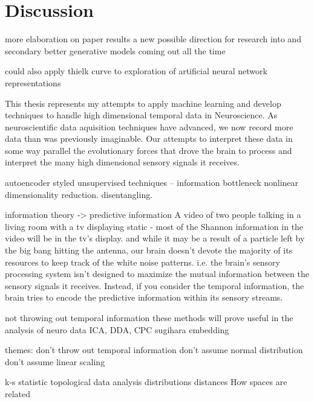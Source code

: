 \chapter{Discussion}
more elaboration on paper results
a new possible direction for research into \CP and secondary 
better generative models coming out all the time

could also apply thielk curve to exploration of artificial neural network representations 


This thesis represents my attempts to apply machine learning and develop techniques to handle high dimensional temporal data in Neuroscience. As neuroscientific data aquisition techniques have advanced, we now record more data than was previously imaginable. Our attempts to interpret these data in some way parallel the evolutionary forces that drove the brain to process and interpret the many high dimensional sensory signals it receives. 

autoencoder styled unsupervised techniques -- information bottleneck
nonlinear dimensionality reduction. disentangling.

information theory -> predictive information
A video of two people talking in a living room with a tv displaying static - most of the Shannon information in the video will be in the tv's display. and while it may be a result of a particle left by the big bang hitting the antenna, our brain doesn't devote the majority of its resources to keep track of the white noise patterns. i.e. the brain's sensory processing system isn't designed to maximize the mutual information between the sensory signals it receives. Instead, if you consider the temporal information, the brain tries to encode the predictive information within its sensory streams. 

not throwing out temporal information
these methods will prove useful in the analysis of neuro data
ICA, DDA, CPC
sugihara embedding

themes:
don't throw out temporal information
don't assume normal distribution
don't assume linear scaling

k-s statistic
topological data analysis
distributions
distances
How spaces are related
